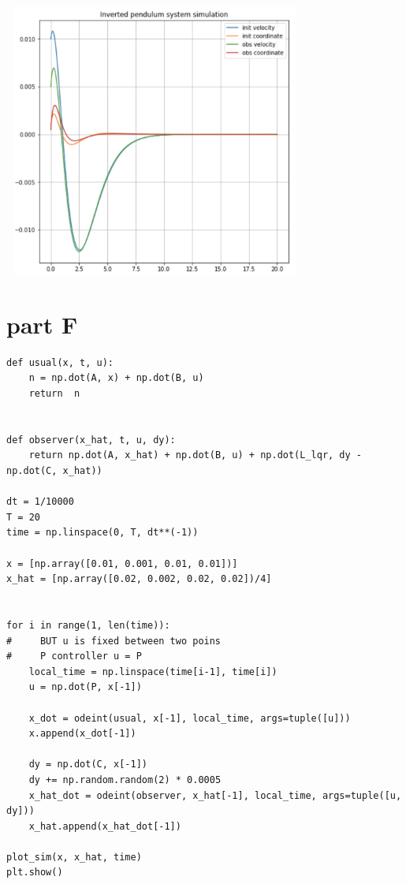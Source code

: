 \documentclass[a4paper,11pt]{article}
\makeatletter
\newcommand{\problemquestion}[1]{\gdef\@problemquestion{#1}}%
\newcommand{\problemsolution}[1]{\gdef\@problemsolution{#1}}%
\theoremstyle{mytheor}
\makeatother
\begin{document}
\includegraphics[width=10cm, height=9cm]{C.png}


\section*{part F}
\begin{problem}
  \problemquestion{Add white gaussian noise to the output ($\delta y = C\delta z + v$).}
  \problemsolution{}
\end{problem}


\begin{lstlisting}
def usual(x, t, u):
    n = np.dot(A, x) + np.dot(B, u)
    return  n


def observer(x_hat, t, u, dy):
    return np.dot(A, x_hat) + np.dot(B, u) + np.dot(L_lqr, dy - np.dot(C, x_hat))

dt = 1/10000
T = 20
time = np.linspace(0, T, dt**(-1))

x = [np.array([0.01, 0.001, 0.01, 0.01])]
x_hat = [np.array([0.02, 0.002, 0.02, 0.02])/4]


for i in range(1, len(time)):
#     BUT u is fixed between two poins
#     P controller u = P
    local_time = np.linspace(time[i-1], time[i])
    u = np.dot(P, x[-1])

    x_dot = odeint(usual, x[-1], local_time, args=tuple([u]))
    x.append(x_dot[-1])
    
    dy = np.dot(C, x[-1]) 
    dy += np.random.random(2) * 0.0005
    x_hat_dot = odeint(observer, x_hat[-1], local_time, args=tuple([u, dy]))
    x_hat.append(x_hat_dot[-1])

plot_sim(x, x_hat, time)
plt.show()
\end{lstlisting}
\end{document}
